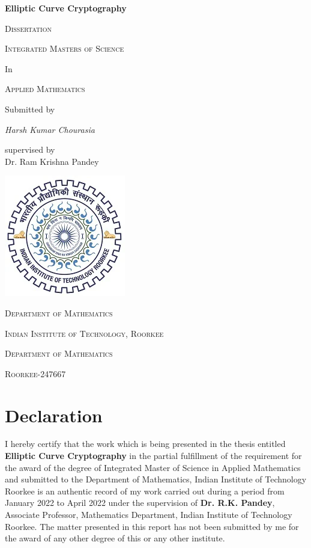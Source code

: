 \documentclass[a4paper,12pt]{report}
\begin{document}
\begin{titlepage}

	\begingroup
	\centering
	{\huge\bfseries Elliptic Curve Cryptography\par}
	\vspace{1cm}
	{\scshape\Large Dissertation\par}
	\vspace{1.5cm}
	{\scshape\LARGE Integrated Masters of Science \par}
	In\\
	{\scshape\LARGE Applied Mathematics \par}
	\vspace{2cm}
	Submitted by\\
	{\Large\itshape Harsh Kumar Chourasia\par}
	\vspace{0.5cm}
	supervised by\\
	Dr. Ram Krishna Pandey
	\vspace{0.5cm}

	\includegraphics[scale=0.75]{logo}

	\vspace{1cm}

	{\scshape\large Department of Mathematics\par}
	{\scshape\large Indian Institute of Technology, Roorkee\par}
	{\scshape\large Department of Mathematics\par}
	{\scshape\large Roorkee-247667\par}
	\endgroup
\end{titlepage}
\section*{Declaration}
I hereby certify that the work which is being presented in the thesis entitled \textbf{Elliptic Curve Cryptography} in the partial fulfillment of the requirement for the award of the degree of Integrated Master of Science in Applied Mathematics
and submitted to the Department of Mathematics, Indian Institute of Technology Roorkee is an authentic record of my work carried out during a period from January 2022 to April 2022 under the supervision of \textbf{Dr. R.K. Pandey}, Associate Professor, Mathematics Department, Indian Institute of Technology Roorkee.
The matter presented in this report has not been submitted by me for the award of any other degree of this or any other institute.\\\\\\
\end{document}
